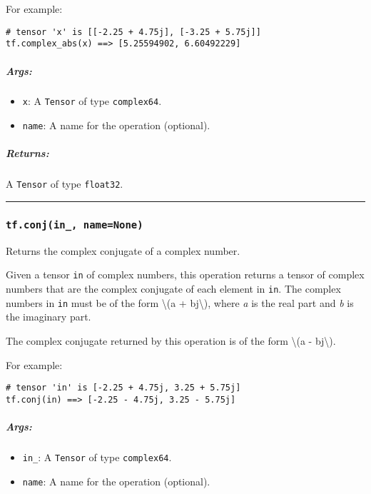 For example:

\begin{verbatim}
# tensor 'x' is [[-2.25 + 4.75j], [-3.25 + 5.75j]]
tf.complex_abs(x) ==> [5.25594902, 6.60492229]
\end{verbatim}

\subparagraph{Args: }\label{args-34}

\begin{itemize}
\tightlist
\item
  \texttt{x}: A \texttt{Tensor} of type \texttt{complex64}.
\item
  \texttt{name}: A name for the operation (optional).
\end{itemize}

\subparagraph{Returns: }\label{returns-34}

A \texttt{Tensor} of type \texttt{float32}.

\begin{center}\rule{0.5\linewidth}{\linethickness}\end{center}

\subsubsection{\texorpdfstring{\texttt{tf.conj(in\_,\ name=None)}
}{tf.conj(in\_, name=None) }}\label{tf.conjinux5f-namenone}

Returns the complex conjugate of a complex number.

Given a tensor \texttt{in} of complex numbers, this operation returns a
tensor of complex numbers that are the complex conjugate of each element
in \texttt{in}. The complex numbers in \texttt{in} must be of the form
\textbackslash{}(a + bj\textbackslash{}), where \emph{a} is the real
part and \emph{b} is the imaginary part.

The complex conjugate returned by this operation is of the form
\textbackslash{}(a - bj\textbackslash{}).

For example:

\begin{verbatim}
# tensor 'in' is [-2.25 + 4.75j, 3.25 + 5.75j]
tf.conj(in) ==> [-2.25 - 4.75j, 3.25 - 5.75j]
\end{verbatim}

\subparagraph{Args: }\label{args-35}

\begin{itemize}
\tightlist
\item
  \texttt{in\_}: A \texttt{Tensor} of type \texttt{complex64}.
\item
  \texttt{name}: A name for the operation (optional).
\end{itemize}

